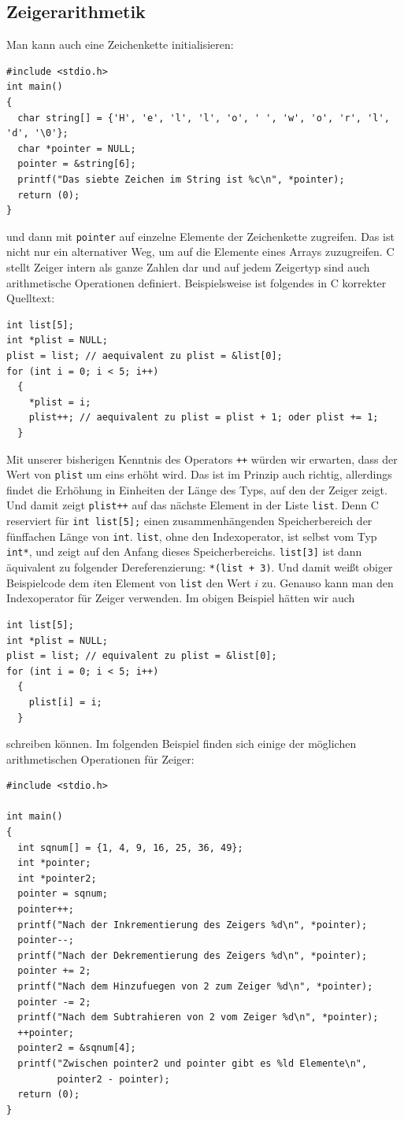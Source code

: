\subsection{Zeigerarithmetik}

Man kann auch eine Zeichenkette initialisieren:
\begin{lstlisting}
#include <stdio.h>
int main()
{
  char string[] = {'H', 'e', 'l', 'l', 'o', ' ', 'w', 'o', 'r', 'l', 'd', '\0'};
  char *pointer = NULL;
  pointer = &string[6];
  printf("Das siebte Zeichen im String ist %c\n", *pointer);
  return (0);
}
\end{lstlisting}
und dann mit \verb|pointer| auf einzelne Elemente der Zeichenkette zugreifen.
Das ist nicht nur ein alternativer Weg, um auf die Elemente eines Arrays zuzugreifen.
C stellt Zeiger intern als ganze Zahlen dar und auf jedem Zeigertyp sind auch arithmetische Operationen definiert.
Beispielsweise ist folgendes in C korrekter Quelltext:
\begin{lstlisting}
int list[5];
int *plist = NULL;
plist = list; // aequivalent zu plist = &list[0];
for (int i = 0; i < 5; i++)
  {
    *plist = i;
    plist++; // aequivalent zu plist = plist + 1; oder plist += 1;
  }
\end{lstlisting}
Mit unserer bisherigen Kenntnis des Operators \verb|++| würden wir erwarten, dass der Wert von \verb|plist| um eins erhöht wird.
Das ist im Prinzip auch richtig, allerdings findet die Erhöhung in Einheiten der Länge des Typs, auf den der Zeiger zeigt.
Und damit zeigt \verb|plist++| auf das nächste Element in der Liste \verb|list|.
Denn C reserviert für \verb|int list[5];| einen zusammenhängenden Speicherbereich der fünffachen Länge von \verb|int|.
\verb|list|, ohne den Indexoperator, ist selbst vom Typ \verb|int*|, und zeigt auf den Anfang dieses Speicherbereichs.
\verb|list[3]| ist dann äquivalent zu folgender Dereferenzierung: \verb|*(list + 3)|.
Und damit weißt obiger Beispielcode dem $i$ten Element von \verb|list| den Wert $i$ zu.
Genauso kann man den Indexoperator für Zeiger verwenden.
Im obigen Beispiel hätten wir auch
\begin{lstlisting}
int list[5];
int *plist = NULL;
plist = list; // equivalent zu plist = &list[0];
for (int i = 0; i < 5; i++)
  {
    plist[i] = i;
  }
\end{lstlisting}
schreiben können.
Im folgenden Beispiel finden sich einige der möglichen arithmetischen Operationen für Zeiger:
\begin{lstlisting}
#include <stdio.h>

int main()
{
  int sqnum[] = {1, 4, 9, 16, 25, 36, 49};
  int *pointer;
  int *pointer2;
  pointer = sqnum;
  pointer++;
  printf("Nach der Inkrementierung des Zeigers %d\n", *pointer);
  pointer--;
  printf("Nach der Dekrementierung des Zeigers %d\n", *pointer);
  pointer += 2;
  printf("Nach dem Hinzufuegen von 2 zum Zeiger %d\n", *pointer);
  pointer -= 2;
  printf("Nach dem Subtrahieren von 2 vom Zeiger %d\n", *pointer);
  ++pointer;
  pointer2 = &sqnum[4];
  printf("Zwischen pointer2 und pointer gibt es %ld Elemente\n",
         pointer2 - pointer);
  return (0);
}
\end{lstlisting}
